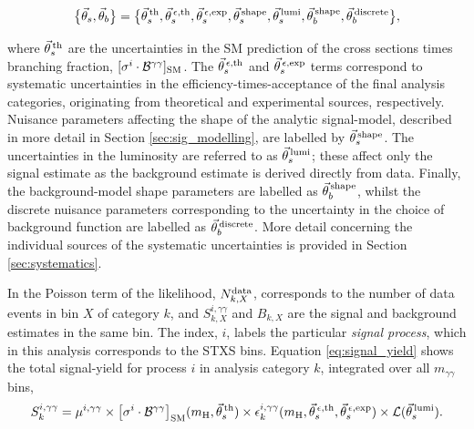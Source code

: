 \begin{equation}\label{eq:systematics_grouping}
    \big\{\vec{\theta}_s,\vec{\theta}_b\big\} = \big\{ \vec{\theta}^{\,\rm{th}}_{s}, \vec{\theta}^{\,\epsilon,{\rm{th}}}_{s}, \vec{\theta}^{\,\epsilon,{\rm{exp}}}_{s}, \vec{\theta}^{\,\rm{shape}}_{s}, \vec{\theta}^{\,\rm{lumi}}_{s}, \vec{\theta}^{\,\rm{shape}}_{b}, \vec{\theta}^{\,\rm{discrete}}_{b}  \big\},
\end{equation}

\noindent
where $\vec{\theta}^{\,\rm{th}}_{s}$ are the uncertainties in the SM prediction of the cross sections times branching fraction, $[\sigma^i \cdot \mathcal{B}^{\gamma\gamma}]_{\rm{SM}}$. The $\vec{\theta}^{\,\epsilon,{\rm{th}}}_{s}$ and $\vec{\theta}^{\,\epsilon,{\rm{exp}}}_{s}$ terms correspond to systematic uncertainties in the efficiency-times-acceptance of the final analysis categories, originating from theoretical and experimental sources, respectively. Nuisance parameters affecting the shape of the analytic signal-model, described in more detail in Section \ref{sec:sig_modelling}, are labelled by $\vec{\theta}^{\,\rm{shape}}_{s}$. The uncertainties in the luminosity are referred to as $\vec{\theta}^{\,\rm{lumi}}_{s}$; these affect only the signal estimate as the background estimate is derived directly from data. Finally, the background-model shape parameters are labelled as $\vec{\theta}^{\,\rm{shape}}_{b}$, whilst the discrete nuisance parameters corresponding to the uncertainty in the choice of background function are labelled as $\vec{\theta}^{\,\rm{discrete}}_{b}$. More detail concerning the individual sources of the systematic uncertainties is provided in Section \ref{sec:systematics}.

In the Poisson term of the likelihood, $N_{k,X}^{\rm{data}}$, corresponds to the number of data events in bin $X$ of category $k$, and $S_{k,X}^{i,\gamma\gamma}$ and $B_{k,X}$ are the signal and background estimates in the same bin. The index, $i$, labels the particular \textit{signal process}, which in this analysis corresponds to the STXS bins. Equation \ref{eq:signal_yield} shows the total signal-yield for process $i$ in analysis category $k$, integrated over all $m_{\gamma\gamma}$ bins,
\begin{equation}\label{eq:signal_yield}
    S_k^{i,\gamma\gamma} = \mu^{i,\gamma\gamma} \times \big[\sigma^i \cdot \mathcal{B}^{\gamma\gamma} \big]_{\rm{SM}}(m_{\rm{H}},\vec{\theta}^{\,\rm{th}}_{s}) \times \epsilon^{i,\gamma\gamma}_k(m_{\rm{H}},\vec{\theta}^{\,\epsilon,{\rm{th}}}_{s}, \vec{\theta}^{\,\epsilon,{\rm{exp}}}_{s}) \times \mathcal{L}(\vec{\theta}^{\,\rm{lumi}}_{s}).
\end{equation}

